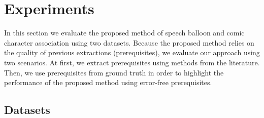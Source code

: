 \documentclass[conference]{IEEEtran}
\begin{document}



\section{Experiments}
\label{sec:experiments}

In this section we evaluate the proposed method of speech balloon and comic character association using two datasets.
Because the proposed method relies on the quality of previous extractions (prerequisites), we evaluate our approach using two scenarios.
At first, we extract prerequisites using methods from the literature.
Then, we use prerequisites from ground truth in order to highlight the performance of the proposed method using error-free prerequisites.





\subsection{Datasets}
\label{sec:dataset}
\end{document}
